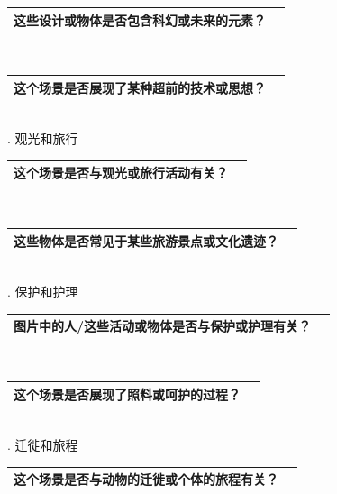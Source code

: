 \documentclass[12pt]{book}
\begin{document}
\begin{tabular}{|p{15cm}|p{3cm}|}
	\hline
这些设计或物体是否包含科幻或未来的元素？\\
	\hline
\end{tabular}\\



\begin{tabular}{|p{15cm}|p{3cm}|}
	\hline
这个场景是否展现了某种超前的技术或思想？\\
	\hline
\end{tabular}\\



. 观光和旅行

\begin{tabular}{|p{15cm}|p{3cm}|}
	\hline
这个场景是否与观光或旅行活动有关？\\
	\hline
\end{tabular}\\




\begin{tabular}{|p{15cm}|p{3cm}|}
	\hline
这些物体是否常见于某些旅游景点或文化遗迹？\\
	\hline
\end{tabular}\\




. 保护和护理

\begin{tabular}{|p{15cm}|p{3cm}|}
	\hline
	图片中的人/这些活动或物体是否与保护或护理有关？\\
	\hline
\end{tabular}\\



\begin{tabular}{|p{15cm}|p{3cm}|}
	\hline
这个场景是否展现了照料或呵护的过程？\\
	\hline
\end{tabular}\\



. 迁徙和旅程

\begin{tabular}{|p{15cm}|p{3cm}|}
	\hline
这个场景是否与动物的迁徙或个体的旅程有关？\\
	\hline
\end{tabular}\\
\end{document}
